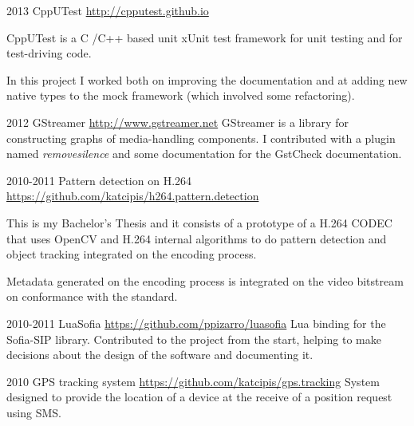 \documentclass[]{friggeri-cv} %
\begin{document}
\begin{entrylist}
\entry
{2013}
{CppUTest}
{\href{http://cpputest.github.io}{http://cpputest.github.io}}
{
CppUTest is a C /C++ based unit xUnit test framework for unit
testing and for test-driving code.

In this project I worked both on improving the documentation and
at adding new native types to the mock framework (which involved
some refactoring).
}
\end{entrylist}

\begin{entrylist}
\entry
{2012}
{GStreamer}
{\href{http://www.gstreamer.net}{http://www.gstreamer.net}}
{
GStreamer is a library for constructing graphs of
media-handling components. I contributed with a plugin
named \emph{removesilence} and some documentation for the
GstCheck documentation.
}
\end{entrylist}

\begin{entrylist}
\entry
{2010-2011}
{Pattern detection on H.264}
{\href{https://github.com/katcipis/h264.pattern.detection}{https://github.com/katcipis/h264.pattern.detection}}
{
This is my Bachelor's Thesis and it consists of a prototype
of a H.264 CODEC that uses OpenCV and H.264 internal
algorithms to do pattern detection and
object tracking integrated on the encoding process.

Metadata generated on the encoding process is integrated on
the video bitstream on conformance with the standard.
}
\end{entrylist}


\begin{entrylist}
\entry
{2010-2011}
{LuaSofia}
{\href{https://github.com/ppizarro/luasofia}{https://github.com/ppizarro/luasofia}}
{
Lua binding for the Sofia-SIP library.
Contributed to the project from the start,
helping to make decisions about the design of the
software and documenting it.
}
\end{entrylist}

\begin{entrylist}
\entry
{2010}
{GPS tracking system}
{\href{https://github.com/katcipis/gps.tracking}{https://github.com/katcipis/gps.tracking}}
{
System designed to provide the location of a device
at the receive of a position request using SMS.
}
\end{entrylist}
\end{document}
